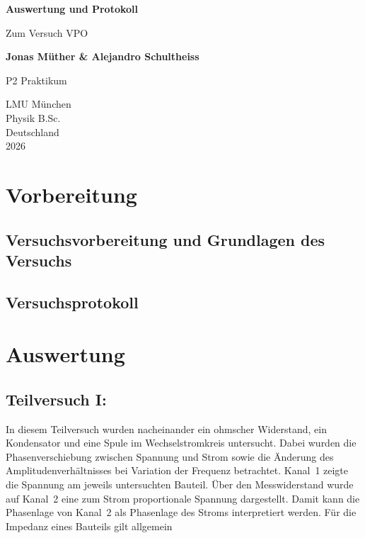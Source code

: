 \documentclass{report}
\begin{document}

\begin{titlepage}
    \begin{center}
        \vspace*{1cm}
            
        \Huge
        \textbf{Auswertung und Protokoll}
            
        \vspace{0.5cm}
        \LARGE
        Zum Versuch VPO
        
        \vspace{1.8cm}

        \textbf{Jonas Müther \& Alejandro Schultheiss}
        \vfill
            
        P2 Praktikum\\
       
            
        \vspace{0.8cm}
  

        \vspace{1.8cm}
        \Large
        LMU München \\
        Physik B.Sc.\\
        Deutschland\\
        2026
            
    \end{center}
\end{titlepage}
\tableofcontents

\newpage
\chapter{Vorbereitung}

\section{Versuchsvorbereitung und Grundlagen des Versuchs}


\section{Versuchsprotokoll}


\newpage
\chapter{Auswertung}
\section{Teilversuch I:}
\noindent
In diesem Teilversuch wurden nacheinander ein ohmscher Widerstand, ein Kondensator und eine Spule im Wechselstromkreis untersucht. Dabei wurden die Phasenverschiebung zwischen Spannung und Strom sowie die Änderung des Amplitudenverhältnisses bei Variation der Frequenz betrachtet.
\noindent
Kanal~1 zeigte die Spannung am jeweils untersuchten Bauteil. Über den Messwiderstand wurde auf Kanal~2 eine zum Strom proportionale Spannung dargestellt. Damit kann die Phasenlage von Kanal~2 als Phasenlage des Stroms interpretiert werden.
\noindent
Für die Impedanz eines Bauteils gilt allgemein
\end{document}
